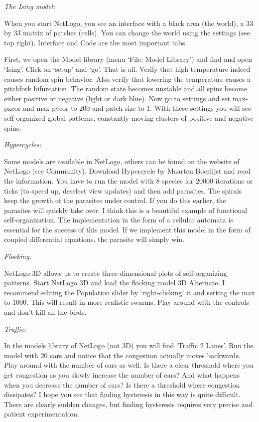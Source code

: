 \documentclass[
  letterpaper,
]{scrbook}
\begin{document}
\emph{The Ising model:}

When you start NetLogo, you see an interface with a black area (the
world), a 33 by 33 matrix of patches (cells). You can change the world
using the settings (see top right). Interface and Code are the most
important tabs.

First, we open the Model library (menu `File: Model Library') and find
and open `Ising'. Click on `setup' and `go'. That is all. Verify that
high temperature indeed causes random spin behavior. Also verify that
lowering the temperature causes a pitchfork bifurcation. The random
state becomes unstable and all spins become either positive or negative
(light or dark blue). Now go to settings and set max-pxcor and max-pycor
to 200 and patch size to 1. With these settings you will see
self-organized global patterns, constantly moving clusters of positive
and negative spins.

\emph{Hypercycles:}

Some models are available in NetLogo, others can be found on the website
of NetLogo (see Community). Download Hypercycle by Maarten Boerlijst and
read the information. You have to run the model with 8 species for 20000
iterations or ticks (to speed up, deselect view updates) and then add
parasites. The spirals keep the growth of the parasites under control.
If you do this earlier, the parasites will quickly take over. I think
this is a beautiful example of functional self-organization. The
implementation in the form of a cellular automata is essential for the
success of this model. If we implement this model in the form of coupled
differential equations, the parasite will simply win.

\emph{Flocking:}

NetLogo 3D allows us to create three-dimensional plots of
self-organizing patterns. Start NetLogo 3D and load the flocking model
3D Alternate. I recommend editing the Population slider by
`right-clicking' it and setting the max to 1000. This will result in
more realistic swarms. Play around with the controls and don't kill all
the birds.

\emph{Traffic:}

In the models library of NetLogo (not 3D) you will find `Traffic 2
Lanes'. Run the model with 20 cars and notice that the congestion
actually moves backwards. Play around with the number of cars as well.
Is there a clear threshold where you get congestion as you slowly
increase the number of cars? And what happens when you decrease the
number of cars? Is there a threshold where congestion dissipates? I hope
you see that finding hysteresis in this way is quite difficult. There
are clearly sudden changes, but finding hysteresis requires very precise
and patient experimentation.
\end{document}
